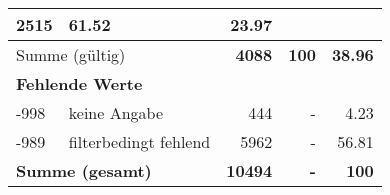 \begin{longtable}{lXrrr}
       \num{2515} &
       \num[round-mode=places,round-precision=2]{61.52} &
         \num[round-mode=places,round-precision=2]{23.97} \\
     \midrule
     \multicolumn{2}{l}{Summe (gültig)} &
       \textbf{\num{4088}} &
     \textbf{\num{100}} &
       \textbf{\num[round-mode=places,round-precision=2]{38.96}} \\
     \multicolumn{5}{l}{\textbf{Fehlende Werte}}\\
       -998 &
       keine Angabe &
         \num{444} &
        - &
         \num[round-mode=places,round-precision=2]{4.23} \\
       -989 &
       filterbedingt fehlend &
         \num{5962} &
        - &
         \num[round-mode=places,round-precision=2]{56.81} \\
     \midrule
     \multicolumn{2}{l}{\textbf{Summe (gesamt)}} &
          \textbf{\num{10494}} &
        \textbf{-} &
        \textbf{\num{100}} \\
     \bottomrule
     \end{longtable}
     
